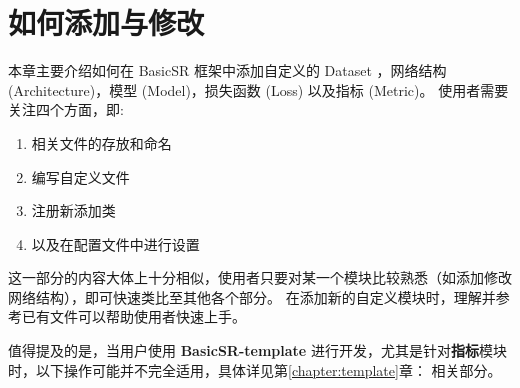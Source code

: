 \documentclass[../main.tex]{subfiles}
\begin{document}
\chapter{如何添加与修改}
\vspace{-2cm}

本章主要介绍如何在 BasicSR 框架中添加自定义的 Dataset ，网络结构 (Architecture)，模型 (Model)，损失函数 (Loss) 以及指标 (Metric)。
使用者需要关注四个方面，即:
\begin{enumerate}
    \item 相关文件的存放和命名
    \item 编写自定义文件
    \item 注册新添加类
    \item 以及在配置文件中进行设置
\end{enumerate}

这一部分的内容大体上十分相似，使用者只要对某一个模块比较熟悉（如添加修改网络结构），即可快速类比至其他各个部分。
在添加新的自定义模块时，理解并参考已有文件可以帮助使用者快速上手。

值得提及的是，当用户使用 \textbf{BasicSR-template} 进行开发，尤其是针对\textbf{指标}模块时，以下操作可能并不完全适用，具体详见第\ref{chapter:template}章： 相关部分。

\end{document}
